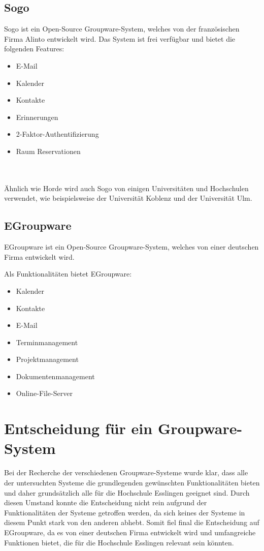\subsection{Sogo}

Sogo ist ein Open-Source Groupware-System, welches von der französischen Firma Alinto entwickelt wird.
Das System ist frei verfügbar und bietet die folgenden Features:

\begin{itemize}
    \item E-Mail
    \item Kalender
    \item Kontakte
    \item Erinnerungen
    \item 2-Faktor-Authentifizierung
    \item Raum Reservationen
\end{itemize}
\autocite{sogo}
\\
\\
Ähnlich wie Horde wird auch Sogo von einigen Universitäten und Hochschulen verwendet, wie beispielsweise der Universität Koblenz und der Universität Ulm.

\subsection{EGroupware}

EGroupware ist ein Open-Source Groupware-System, welches von einer deutschen Firma entwickelt wird.

Als Funktionalitäten bietet EGroupware:

\begin{itemize}
    \item Kalender
    \item Kontakte
    \item E-Mail
    \item Terminmanagement
    \item Projektmanagement
    \item Dokumentenmanagement
    \item Online-File-Server
\end{itemize}


\section{Entscheidung für ein Groupware-System}

Bei der Recherche der verschiedenen Groupware-Systeme wurde klar, dass alle der untersuchten Systeme die grundlegenden gewünschten Funktionalitäten bieten und daher grundsätzlich alle für die Hochschule Esslingen geeignet sind.
Durch diesen Umstand konnte die Entscheidung nicht rein aufgrund der Funktionalitäten der Systeme getroffen werden, da sich keines der Systeme in diesem Punkt stark von den anderen abhebt.
Somit fiel final die Entscheidung auf EGroupware, da es von einer deutschen Firma entwickelt wird und umfangreiche Funktionen bietet, die für die Hochschule Esslingen relevant sein könnten.




